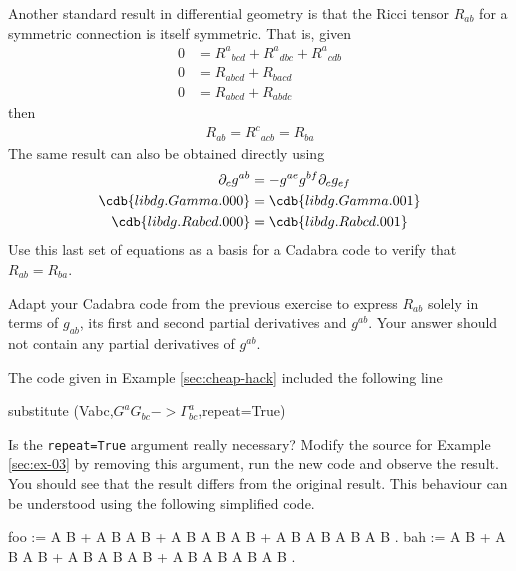 \documentclass[a4paper,12pt]{article}
\numberwithin{equation}{section}%
\begin{document}
\begin{Exercises}
   \begin{Exercise}
      Another standard result in differential geometry is that the Ricci tensor $R_{ab}$
      for a symmetric connection is itself symmetric. That is, given
      \begin{align*}
          0 &= R^{a}{}_{bcd} + R^{a}{}_{dbc} + R^{a}{}_{cdb}\\
          0 &= R_{abcd} + R_{bacd}\\
          0 &= R_{abcd} + R_{abdc}
      \end{align*}
      then
      \begin{align*}
         R_{ab} = R^{c}{}_{acb} = R_{ba}
      \end{align*}
      The same result can also be obtained directly using
      \begin{align*}
         \partial_{c} g^{a b}  &= - g^{a e} g^{b f} \partial_{c} g_{e f}\\
         \cdb{libdg.Gamma.000} &= \cdb{libdg.Gamma.001}\\
         \cdb{libdg.Rabcd.000} &= \cdb{libdg.Rabcd.001}
      \end{align*}
      Use this last set of equations as a basis for a Cadabra code to verify that $R_{ab} =
      R_{ba}$.
   \end{Exercise}

   \begin{Exercise}
      Adapt your Cadabra code from the previous exercise to express $R_{ab}$ solely in terms
      of $g_{ab}$, its first and second partial derivatives and $g^{ab}$. Your answer should
      not contain any partial derivatives of $g^{ab}$.
   \end{Exercise}

   \begin{Exercise}
      The code given in Example \ref{sec:cheap-hack} included the following line
      \begin{cadabra}
         substitute (Vabc,$G^{a} G_{b c} -> \Gamma^{a}_{b c}$,repeat=True)
      \end{cadabra}
      Is the \verb|repeat=True| argument really necessary? Modify the source for Example
      \ref{sec:ex-03} by removing this argument, run the new code and observe the result.
      You should see that the result differs from the original result. This behaviour can be
      understood using the following simplified code.
      \begin{cadabra}
         foo := A B + A B A B + A B A B A B + A B A B A B A B .
         bah := A B + A B A B + A B A B A B + A B A B A B A B .


\end{cadabra}
\end{Exercise}
\end{Exercises}
\end{document}
